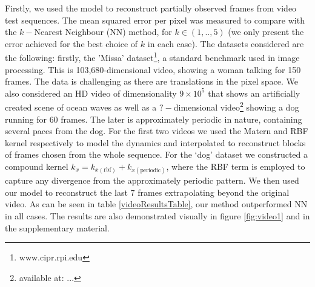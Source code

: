 \documentclass{article} %
\begin{document}
 Firstly, we used the
model to reconstruct partially observed frames from video test
sequences. The mean squared error per pixel was measured to compare
with the $k-$Nearest Neighbour (NN) method, for $k \in (1,..,5)$ (we
only present the error achieved for the best choice of $k$ in each
case). The datasets considered are the following: firstly, the 'Missa'
dataset\footnote{www.cipr.rpi.edu}, a standard benchmark used in image
processing. This is 103,680-dimensional video, showing a woman talking
for 150 frames. The data is challenging as there are translations in
the pixel space. We also considered an HD video of dimensionality $9
\times 10^5$ that shows an artificially created scene of ocean waves
as well as a $?-$dimensional video\footnote{available at: ...} showing
a dog running for $60$ frames. The later is approximately periodic in
nature, containing several paces from the dog. For the first two
videos we used the Matern and RBF kernel respectively to model the
dynamics and interpolated to reconstruct blocks of frames chosen from
the whole sequence. For the `dog' dataset we constructed a compound
kernel $k_x = k_{x(\text{rbf})} + k_{x(\text{periodic})}$, where the
RBF term is employed to capture any divergence from the approximately
periodic pattern. We then used our model to reconstruct the last 7
frames extrapolating beyond the original video. As can be seen in
table \ref{videoResultsTable}, our method outperformed NN in all
cases. The results are also demonstrated visually in figure
\ref{fig:video1} and in the supplementary material. 



\end{document}
